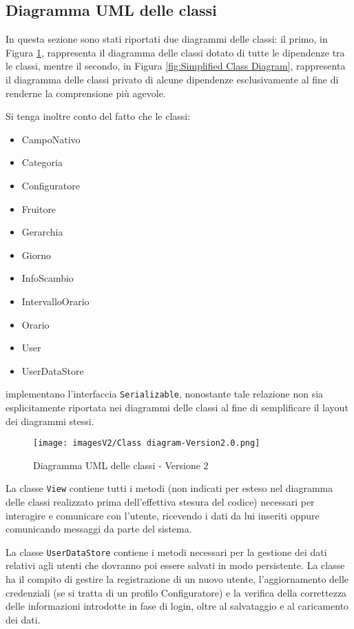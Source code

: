 \subsection{Diagramma UML delle classi}
In questa sezione sono stati riportati due diagrammi delle classi: il primo, in Figura \ref{fig:Class Diagram}, rappresenta il diagramma delle classi dotato di tutte le dipendenze tra le classi, mentre il secondo, in Figura \ref{fig:Simplified Class Diagram}, rappresenta il diagramma delle classi privato di alcune dipendenze esclusivamente al fine di renderne la comprensione più agevole.

Si tenga inoltre conto del fatto che le classi:
\begin{itemize}
    \item CampoNativo
    \item Categoria
    \item Configuratore
    \item Fruitore
    \item Gerarchia
    \item Giorno
    \item InfoScambio
    \item IntervalloOrario
    \item Orario
    \item User
    \item UserDataStore
\end{itemize}
implementano l'interfaccia \texttt{Serializable}, nonostante tale relazione non sia esplicitamente riportata nei diagrammi delle classi al fine di semplificare il layout dei diagrammi stessi.

\begin{figure}[h!]
    \centering
    \texttt{[image: imagesV2/Class diagram-Version2.0.png]}
    \caption{\label{fig:Class Diagram}Diagramma UML delle classi - Versione 2}
\end{figure} 

La classe \texttt{View} contiene tutti i metodi (non indicati per esteso nel diagramma delle classi realizzato prima dell'effettiva stesura del codice) necessari per interagire e comunicare con l'utente, ricevendo i dati da lui inseriti oppure comunicando messaggi da parte del sistema.

La classe \texttt{UserDataStore} contiene i metodi necessari per la gestione dei dati relativi agli utenti che dovranno poi essere salvati in modo persistente. La classe ha il compito di gestire la registrazione di un nuovo utente, l'aggiornamento delle credenziali (se si tratta di un profilo Configuratore) e la verifica della correttezza delle informazioni introdotte in fase di login, oltre al salvataggio e al caricamento dei dati. 

